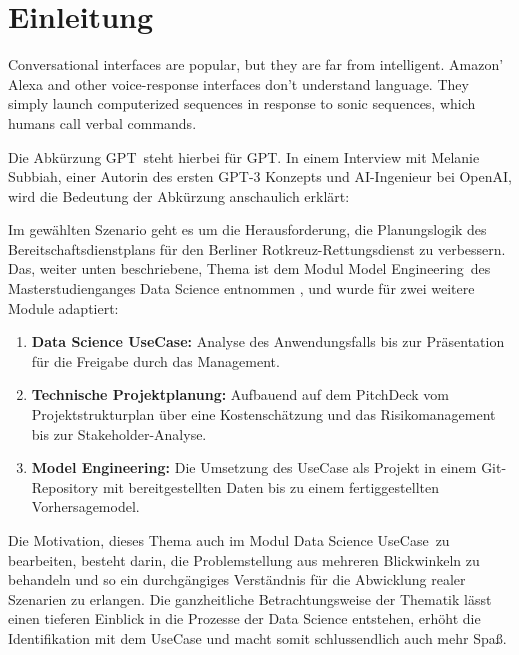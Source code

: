 \chapter{Einleitung}

\begin{addmargin}[1.27cm]{0cm}
Conversational interfaces are popular, but they are far from intelligent. Amazon' Alexa and other voice-response interfaces don't understand language. They simply launch computerized sequences in response to sonic sequences, which humans call verbal commands.
\end{addmargin}

Die Abkürzung \glqq GPT\grqq\ steht hierbei für \ac{GPT}. In einem Interview mit Melanie Subbiah, einer Autorin des ersten GPT-3 Konzepts und \ac{AI}-Ingenieur bei OpenAI, wird die Bedeutung der Abkürzung anschaulich erklärt:

Im gewählten Szenario geht es um die Herausforderung, die Planungslogik des Bereitschaftsdienstplans für den Berliner Rotkreuz-Rettungsdienst zu verbessern. Das, weiter unten beschriebene, Thema ist dem Modul \glqq Model Engineering\grqq\ des Masterstudienganges Data Science entnommen \citep{pak_aufgabenstellung_dlmdwme01_2024}, und wurde für zwei weitere Module adaptiert: 

\begin{enumerate}
  \itemsep-8pt
  \item \textbf{Data Science UseCase:} Analyse des Anwendungsfalls bis zur Präsentation für die Freigabe durch das Management.
  \item \textbf{Technische Projektplanung:} Aufbauend auf dem PitchDeck vom Projektstrukturplan über eine Kostenschätzung und das Risikomanagement bis zur Stakeholder-Analyse.
  \item \textbf{Model Engineering:} Die Umsetzung des UseCase als Projekt in einem Git-Repository mit bereitgestellten Daten bis zu einem fertiggestellten Vorhersagemodel.
\end{enumerate}

Die Motivation, dieses Thema auch im Modul \glqq Data Science UseCase\grqq\ zu bearbeiten,  besteht darin, die Problemstellung aus mehreren Blickwinkeln zu behandeln und so ein durchgängiges Verständnis für die Abwicklung realer Szenarien zu erlangen. Die ganzheitliche Betrachtungsweise der Thematik lässt einen tieferen Einblick in die Prozesse der Data Science entstehen, erhöht die Identifikation mit dem UseCase und macht somit schlussendlich auch mehr Spaß.	